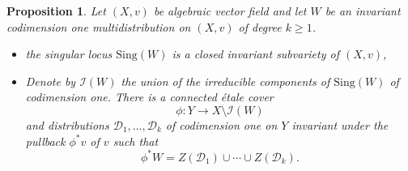 \documentclass[12pt]{amsart}
\theoremstyle{definition}
\theoremstyle{plain}
\newtheorem{proposition}[definition]{Proposition}
\theoremstyle{exampstyle}
\theoremstyle{exampstyle}\newtheorem{thmxbis}{Theorem}
\numberwithin{equation}{section}
\theoremstyle{remark}
\begin{document}
\begin{proposition} \label{proposition-preparation-multidistribution}
Let $(X,v)$ be algebraic vector field and let $W$ be an invariant codimension one multidistribution on $(X,v)$ of degree $k \geq 1$.

\begin{itemize} 
\item[(i)] the singular locus $\mathrm{Sing}(W)$ is a closed invariant subvariety of $(X,v)$, 
\item[(ii)] Denote by $\mathcal I(W)$ the union of the irreducible components of $\mathrm{Sing}(W)$ of codimension one. There is a connected étale cover 
$$ \phi :Y \rightarrow X \setminus \mathcal I(W)$$ 
and  distributions $\mathcal D_1,\ldots, \mathcal D_k$ of codimension one on $Y$ invariant under the pullback $\phi^\ast v$ of $v$ such that 
$$ \phi^\ast W = Z(\mathcal D_1) \cup  \cdots \cup Z(\mathcal D_k).$$
\end{itemize}  
\end{proposition} 
\end{document}

